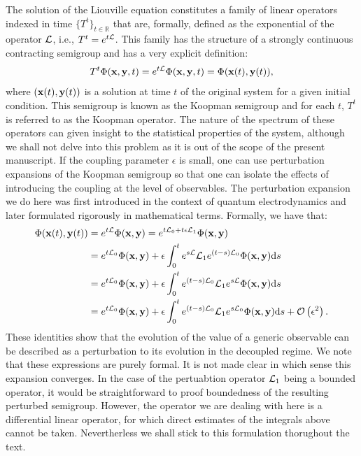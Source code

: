 \documentclass[12pt]{article}
\begin{document}
The solution of the Liouville equation constitutes a family of linear operators indexed in time $\{T^t\}_{t\in \mathbb{R}}$ that are, formally, defined as the exponential of the operator $\mathcal{L}$, i.e., $T^t=e^{t\mathcal{L}}$. This family has the structure of a strongly continuous contracting semigroup and has a very explicit definition:
\begin{equation}
T^t\Phi(\mathbf{x}, \mathbf{y} , t) = e^{t\mathcal{L}}\Phi (\mathbf{x} , \mathbf{y} ,t ) = \Phi (\mathbf{x}(t),\mathbf{y}(t)),
\end{equation}
where $(\mathbf{x}(t),\mathbf{y}(t))$ is a solution at time $t$ of the original system for a given initial condition. This semigroup is known as the Koopman semigroup and for each $t$, $T^t$ is referred to as the Koopman operator. The nature of the spectrum of these operators can given insight to the statistical properties of the system, although we shall not delve into this problem as it is out of the scope of the present manuscript. If the coupling parameter $\epsilon$ is small, one can use perturbation expansions of the Koopman semigroup so that one can isolate the effects of introducing the coupling at the level of observables. The perturbation expansion we do here was first introduced in the context of quantum electrodynamics \cite{Dyson1949} and later formulated rigorously in mathematical terms. Formally, we have that:
\begin{align} 
\Phi(\mathbf{x}(t),\mathbf{y}(t)) &= e^{t\mathcal{L}}\Phi(\mathbf{x},\mathbf{y})=e^{t\mathcal{L}_0+t\epsilon \mathcal{L}_1}	\Phi(\mathbf{x},\mathbf{y}) \\\label{pertexp1} &= e^{t\mathcal{L}_0}\Phi(\mathbf{x},\mathbf{y})+\epsilon\int_{0}^te^{s\mathcal{L}}\mathcal{L}_1e^{(t-s)\mathcal{L}_0}\Phi(\mathbf{x},\mathbf{y})\mathrm{d} s\\\label{pertexp2}  &= e^{t\mathcal{L}_0}\Phi(\mathbf{x},\mathbf{y})+\epsilon\int_{0}^te^{(t-s)\mathcal{L}_0}\mathcal{L}_1e^{s\mathcal{L}}\Phi(\mathbf{x},\mathbf{y})\mathrm{d} s \\\label{pertexp3}&= e^{t\mathcal{L}_0}\Phi(\mathbf{x},\mathbf{y})+\epsilon\int_{0}^te^{(t-s)\mathcal{L}_0}\mathcal{L}_1e^{s\mathcal{L}_0}\Phi(\mathbf{x},\mathbf{y})\mathrm{d} s + \mathcal{O}\left(\epsilon^2\right).
\end{align}
These identities show that the evolution of the value of a generic observable can be described as a perturbation to its evolution in the decoupled regime. We note that these expressions are purely formal. It is not made clear in which sense this expansion converges. In the case of the pertuabtion operator $\mathcal{L}_1$ being a bounded operator, it would be straightforward to proof boundedness of the resulting perturbed semigroup. However, the operator we are dealing with here is a differential linear operator, for which direct estimates of the integrals above cannot be taken. Nevertherless we shall stick to this formulation thorughout the text.
\end{document}
